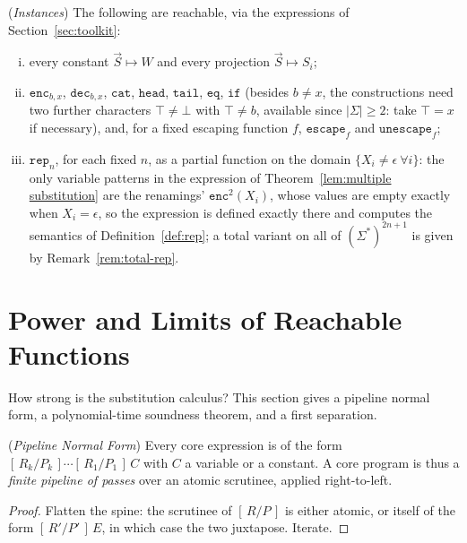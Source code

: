 \documentclass[runningheads,envcountsect]{llncs}
\begin{document}
\begin{proposition}
    (\emph{Instances})
    \label{prop:instances}
    The following are reachable, via the expressions of Section~\ref{sec:toolkit}:
    \begin{enumerate}[(i)]
        \item every constant $\vec S \mapsto W$ and every projection $\vec S \mapsto S_i$;
        \item $\mathtt{enc}_{b,x}$, $\mathtt{dec}_{b,x}$, $\mathtt{cat}$, $\mathtt{head}$, $\mathtt{tail}$, $\mathtt{eq}$, $\mathtt{if}$ (besides $b \neq x$, the constructions need two further characters $\top \neq \bot$ with $\top \neq b$, available since $|\Sigma| \geq 2$: take $\top = x$ if necessary), and, for a fixed escaping function $f$, $\mathtt{escape}_f$ and $\mathtt{unescape}_f$;
        \item $\mathtt{rep}_n$, for each fixed $n$, as a partial function on the domain $\{X_i \neq \epsilon \ \forall i\}$: the only variable patterns in the expression of Theorem~\ref{lem:multiple substitution} are the renamings' $\mathtt{enc}^2(X_i)$, whose values are empty exactly when $X_i = \epsilon$, so the expression is defined exactly there and computes the semantics of Definition~\ref{def:rep}; a total variant on all of $(\Sigma^*)^{2n+1}$ is given by Remark~\ref{rem:total-rep}.
    \end{enumerate}
\end{proposition}

\section{Power and Limits of Reachable Functions}
\label{sec:limits}

How strong is the substitution calculus? This section gives a pipeline normal form, a polynomial-time soundness theorem, and a first separation.

\begin{proposition}
    (\emph{Pipeline Normal Form})
    \label{prop:pipeline}
    Every core expression is of the form $[\,R_k/P_k\,]\cdots[\,R_1/P_1\,]\,C$ with $C$ a variable or a constant. A core program is thus a \emph{finite pipeline of passes} over an atomic scrutinee, applied right-to-left.
\end{proposition}

\begin{proof}
    Flatten the spine: the scrutinee of $[\,R/P\,]$ is either atomic, or itself of the form $[\,R'/P'\,]\,E$, in which case the two juxtapose. Iterate.
\end{proof}
\end{document}
